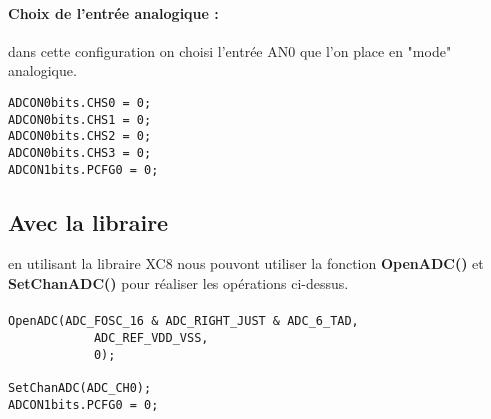 \paragraph{Choix de l'entrée analogique :} dans cette configuration on choisi l'entrée AN0 que l'on place en "mode" analogique. 
 
\begin{lstlisting}
ADCON0bits.CHS0 = 0;
ADCON0bits.CHS1 = 0;
ADCON0bits.CHS2 = 0;
ADCON0bits.CHS3 = 0;
ADCON1bits.PCFG0 = 0;
\end{lstlisting}

\subsection{Avec la libraire}
en utilisant la libraire XC8 nous pouvont utiliser la fonction \textbf{OpenADC()} et \textbf{ SetChanADC()} pour réaliser les opérations ci-dessus.

\paragraph{}
\begin{lstlisting}
OpenADC(ADC_FOSC_16 & ADC_RIGHT_JUST & ADC_6_TAD,
            ADC_REF_VDD_VSS,
            0);

SetChanADC(ADC_CH0);
ADCON1bits.PCFG0 = 0;
\end{lstlisting}

